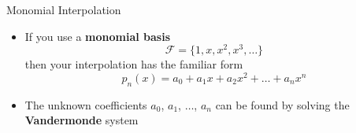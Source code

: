 \documentclass[10pt]{beamer}
\begin{document}
\begin{frame}{Monomial Interpolation}


\begin{itemize}
    \item If you use a \textbf{monomial basis}
    $$ \mathcal{F}= \{1, x, x^2, x^3,\ldots \}$$ 
    then your interpolation has the familiar form 
      \begin{equation*}
    p_n(x) = a_0 + a_1 x + a_2 x^2 +\dots + a_{n} x^{n}
  \end{equation*}
    \item The unknown coefficients $a_0$, $a_1$, $\ldots$, $a_n$ can be found by solving the \textbf{Vandermonde} system
\end{itemize}
\end{frame}
\end{document}
